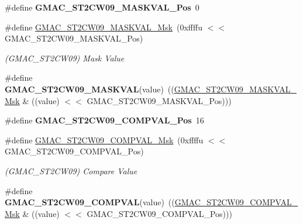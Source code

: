 \begin{DoxyCompactItemize}
\#define {\bfseries G\+M\+A\+C\+\_\+\+S\+T2\+C\+W09\+\_\+\+M\+A\+S\+K\+V\+A\+L\+\_\+\+Pos}~0
\item 
\mbox{\label{group__SAME70__GMAC_ga58b8e99ec0fc2a1f7cd3c31478fba854}} 
\#define \mbox{\hyperlink{group__SAME70__GMAC_ga58b8e99ec0fc2a1f7cd3c31478fba854}{G\+M\+A\+C\+\_\+\+S\+T2\+C\+W09\+\_\+\+M\+A\+S\+K\+V\+A\+L\+\_\+\+Msk}}~(0xffffu $<$$<$ G\+M\+A\+C\+\_\+\+S\+T2\+C\+W09\+\_\+\+M\+A\+S\+K\+V\+A\+L\+\_\+\+Pos)
\begin{DoxyCompactList}\small\item\em (G\+M\+A\+C\+\_\+\+S\+T2\+C\+W09) Mask Value \end{DoxyCompactList}\item 
\mbox{\label{group__SAME70__GMAC_gadddce749d6806c9541783e9dd86b55ad}} 
\#define {\bfseries G\+M\+A\+C\+\_\+\+S\+T2\+C\+W09\+\_\+\+M\+A\+S\+K\+V\+AL}(value)~((\mbox{\hyperlink{group__SAMV71__GMAC_ga58b8e99ec0fc2a1f7cd3c31478fba854}{G\+M\+A\+C\+\_\+\+S\+T2\+C\+W09\+\_\+\+M\+A\+S\+K\+V\+A\+L\+\_\+\+Msk}} \& ((value) $<$$<$ G\+M\+A\+C\+\_\+\+S\+T2\+C\+W09\+\_\+\+M\+A\+S\+K\+V\+A\+L\+\_\+\+Pos)))
\item 
\mbox{\label{group__SAME70__GMAC_ga7d5ee5b8aa476a616134763980a7e6f2}} 
\#define {\bfseries G\+M\+A\+C\+\_\+\+S\+T2\+C\+W09\+\_\+\+C\+O\+M\+P\+V\+A\+L\+\_\+\+Pos}~16
\item 
\mbox{\label{group__SAME70__GMAC_gaaa873b33e63edb3fff0c5ce144aa8b54}} 
\#define \mbox{\hyperlink{group__SAME70__GMAC_gaaa873b33e63edb3fff0c5ce144aa8b54}{G\+M\+A\+C\+\_\+\+S\+T2\+C\+W09\+\_\+\+C\+O\+M\+P\+V\+A\+L\+\_\+\+Msk}}~(0xffffu $<$$<$ G\+M\+A\+C\+\_\+\+S\+T2\+C\+W09\+\_\+\+C\+O\+M\+P\+V\+A\+L\+\_\+\+Pos)
\begin{DoxyCompactList}\small\item\em (G\+M\+A\+C\+\_\+\+S\+T2\+C\+W09) Compare Value \end{DoxyCompactList}\item 
\mbox{\label{group__SAME70__GMAC_ga880e337c64fedd58b293f503ed5f89f4}} 
\#define {\bfseries G\+M\+A\+C\+\_\+\+S\+T2\+C\+W09\+\_\+\+C\+O\+M\+P\+V\+AL}(value)~((\mbox{\hyperlink{group__SAMV71__GMAC_gaaa873b33e63edb3fff0c5ce144aa8b54}{G\+M\+A\+C\+\_\+\+S\+T2\+C\+W09\+\_\+\+C\+O\+M\+P\+V\+A\+L\+\_\+\+Msk}} \& ((value) $<$$<$ G\+M\+A\+C\+\_\+\+S\+T2\+C\+W09\+\_\+\+C\+O\+M\+P\+V\+A\+L\+\_\+\+Pos)))

\end{DoxyCompactItemize}
